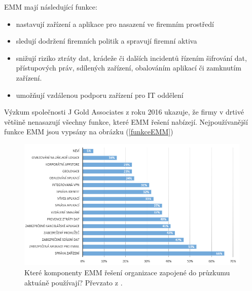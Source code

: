  EMM mají následující funkce:
 \begin{itemize}
     \item nastavují zařízení a aplikace pro nasazení ve firemním prostředí
     \item sledují dodržení firemních politik a spravují firemní aktiva
     \item snižují riziko ztráty dat, krádeže či dalších incidentů řízením šifrování dat, přístupových práv, sdílených zařízení, obalováním aplikací či zamknutím zařízení.
     \item umožňují vzdálenou podporu zařízení pro IT oddělení
 \end{itemize}
 
Výzkum společnosti J Gold Associates z roku 2016 \cite{JBBrief} 
ukazuje, že firmy v drtivé většině nenasazují všechny funkce, které EMM řešení nabízejí. Nejpoužívanější funkce EMM jsou vypsány na obrázku (\ref{funkceEMM}) 

\begin{figure}[h!]
\centering
\includegraphics[width=13cm]{img/funkceEMM}
\caption{Které komponenty EMM řešení organizace zapojené do průzkumu aktuáně používají? Převzato z \cite{JBBrief}.} 
\end{figure}\label{funkceEMM}

 
 
 
